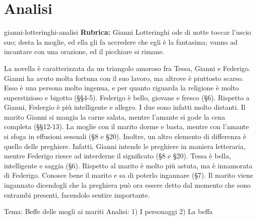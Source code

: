 \documentclass[preview]{standalone}
\begin{document}
\genpage

\section{Analisi}

\begin{snippet}{gianni-lotteringhi-analisi}
    \textbf{Rubrica:} Gianni Lotteringhi ode di notte toccar l'uscio suo; desta la moglie, ed ella gli fa accredere che egli è la fantasima; vanno ad incantare con una orazione, ed il picchiare si rimane.

    
    La novella è caratterizzata da un triangolo amoroso fra Tessa, Gianni e Federigo.
    Gianni ha avuto molta fortuna con il suo lavoro, ma altrove è piuttosto scarso.
    Esso è una persona molto ingenua, e per quanto riguarda la religione è molto
    superstizioso e bigotto (§§4-5).
    Federigo è bello, giovane e fresco (§6).
    Rispetto a Gianni, Federgio è più intelligente e allegro.
    I due sono infatti molto distanti.
    Il marito Gianni si mangia la carne salata, mentre l'amante si gode la cena completa (§§12-13).
    La moglie con il marito dorme e basta, mentre con l'amante si sfoga in effusioni sessuali (§8 e §20).
    Inoltre, un altro elemento di differenza è quello delle preghiere. Infatti, Gianni intende le preghiere in maniera letteraria,
    mentre Federigo riesce ad interderne il significato (§8 e §20).
    Tessa è bella, intelligente e saggia (§6). Rispetto al marito è molto più astuta, ma è innamorata di Federigo.
    Conosce bene il marito e sa di poterlo ingannare (§7).
    Il marito viene ingannato dicendogli che la preghiera può ora essere detto dal momento che sono
    entrambi presenti, facendolo sentire importante.
    
    
\end{snippet}


Tema: Beffe delle mogli ai mariti 
Analisi: 
    1) I personaggi
    2) La beffa
\end{document}
